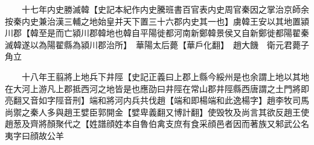 　　十七年内史勝滅韓【史記本紀作内史騰班書百官表内史周官秦因之掌治京師余按秦内史兼治漢三輔之地始皇并天下置三十六郡内史其一也】虜韓王安以其地置潁川郡【韓至是而亡潁川郡韓地也韓自平陽徙都河南新鄭韓景侯又自新鄭徙都陽翟秦滅韓遂以為陽翟縣為潁川郡治所】　華陽太后薨【華戶化翻】　趙大饑　衛元君薨子角立

　　十八年王翦將上地兵下井陘【史記正義曰上郡上縣今綏州是也余謂上地以其地在大河上游凡上郡抵西河之地皆是也應劭曰井陘在常山郡井陘縣西唐謂之土門將即亮翻又音如字陘音刑】端和將河内兵共伐趙【端和即楊端和此逸楊字】趙李牧司馬尚禦之秦人多與趙王嬖臣郭開金【嬖卑義翻又博計翻】使毁牧及尚言其欲反趙王使趙葱及齊將顏聚代之【姓譜顔姓本自魯伯禽支庶有食采顔邑者因而著族又邾武公名夷字曰顔故公羊